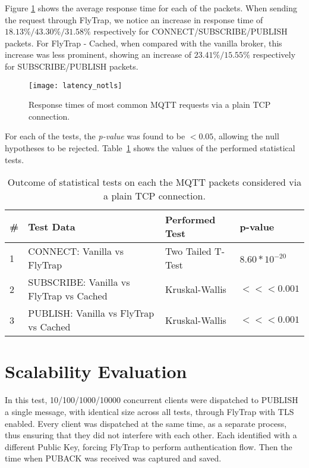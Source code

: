Figure \ref{fig:latency_notls} shows the average response time for each of the packets. When sending the request through FlyTrap, we notice an increase in response time of $18.13\%/43.30\%/31.58\%$ respectively for CONNECT/SUBSCRIBE/PUBLISH packets. For FlyTrap - Cached, when compared with the vanilla broker, this increase was less prominent, showing an increase of $23.41\%/15.55\%$ respectively for SUBSCRIBE/PUBLISH packets. 

\begin{figure}[h]
    \centering
    \texttt{[image: latency\_notls]}
    \caption{Response times of most common MQTT requests via a plain TCP connection.}
    \label{fig:latency_notls}
\end{figure}

For each of the tests, the \textit{p-value} was found to be $<0.05$, allowing the null hypotheses to be rejected. Table\ \ref{tab:ttest-notls} shows the values of the performed statistical tests.

\begin{table}[h]
\centering
\begin{tabular}{|l|l|l|l|}
\hline
\textbf{\#} & \textbf{Test Data}                       & \textbf{Performed Test} & \textbf{p-value}                      \\ \hline
1           & CONNECT: Vanilla vs FlyTrap              & Two Tailed T-Test       & $8.60*10^{-20}$                    \\ \hline
2           & SUBSCRIBE: Vanilla vs FlyTrap vs Cached & Kruskal-Wallis          & $<<< 0.001$ \\ \hline
3           & PUBLISH: Vanilla vs FlyTrap vs Cached & Kruskal-Wallis          & $<<< 0.001$ \\ \hline
\end{tabular}
\caption{Outcome of statistical tests on each the MQTT packets considered via a plain TCP connection.}
\label{tab:ttest-notls}
\end{table}


\section{Scalability Evaluation}
In this test, 10/100/1000/10000 concurrent clients were dispatched to PUBLISH a single message, with identical size across all tests, through FlyTrap with TLS enabled. Every client was dispatched at the same time, as a separate process, thus ensuring that they did not interfere with each other. Each identified with a different Public Key, forcing FlyTrap to perform authentication flow. Then the time when PUBACK was received was captured and saved.

